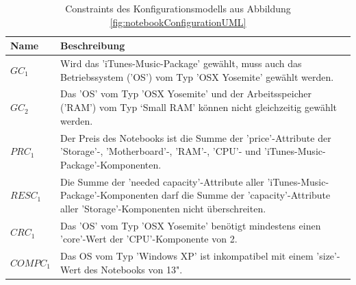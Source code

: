 \documentclass[11pt, a4paper, titlepage, listof=totoc, bibliography=totoc, index=totoc, twoside, openright, headings=normal]{scrreprt}
\begin{document}
\begin{table}[]
\centering
\caption{Constraints des Konfigurationsmodells aus Abbildung \ref{fig:notebookConfigurationUML}}
\label{tab:notebookConfigurationConstraints}
\begin{tabularx}{\textwidth}{|l|X|}
\hline
{\bf Name} & {\bf Beschreibung}\\
\hline
$GC_1$ & Wird das 'iTunes-Music-Package' gewählt, muss auch das Betriebssystem ('OS') vom Typ 'OSX Yosemite' gewählt werden. \\
\hline
$GC_2$ & Das 'OS' vom Typ 'OSX Yosemite' und der Arbeitsspeicher ('RAM') vom Typ ‘Small RAM' können nicht gleichzeitig gewählt werden.\\
\hline
$PRC_1$ & Der Preis des Notebooks ist die Summe der 'price'-Attribute der 'Storage'-, 'Motherboard'-, 'RAM'-, 'CPU'- und 'iTunes-Music-Package'-Komponenten.\\
\hline
$RESC_1$ & Die Summe der 'needed capacity'-Attribute aller 'iTunes-Music-Package'-Komponenten darf die Summe der 'capacity'-Attribute aller 'Storage'-Komponenten nicht überschreiten.\\
\hline
$CRC_1$ & Das 'OS' vom Typ 'OSX Yosemite' benötigt mindestens einen 'core'-Wert der 'CPU'-Komponente von 2.\\
\hline
$COMPC_1$ & Das OS vom Typ 'Windows XP' ist inkompatibel mit einem 'size'-Wert des Notebooks von 13".\\
\hline
\end{tabularx}
\end{table}
\end{document}
